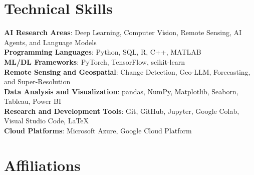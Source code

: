\documentclass[a4paper,11pt]{article}
\begin{document}
\section{Technical Skills}
    \begin{itemize}[leftmargin=0.15in, label={}]
        \small{\item{
         \textbf{AI Research Areas}{: Deep Learning, Computer Vision, Remote Sensing, AI Agents, and Language Models} \\
         \textbf{Programming Languages}{: Python, SQL, R, C++, MATLAB} \\
         \textbf{ML/DL Frameworks}{: PyTorch, TensorFlow, scikit-learn} \\
         \textbf{Remote Sensing and Geospatial}{: Change Detection, Geo-LLM, Forecasting, and Super-Resolution} \\
         \textbf{Data Analysis and Visualization}{: pandas, NumPy, Matplotlib, Seaborn, Tableau, Power BI}\\
         \textbf{Research and Development Tools}{: Git, GitHub, Jupyter, Google Colab, Visual Studio Code, \LaTeX}\\
         \textbf{Cloud Platforms}{: Microsoft Azure, Google Cloud Platform}
        }}
    \end{itemize}

\section{Affiliations}
\end{document}
